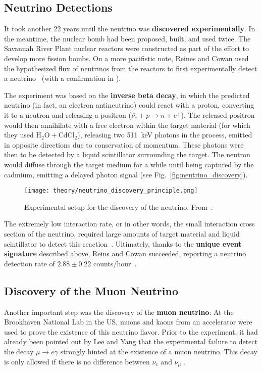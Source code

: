 \subsection{Neutrino Detections}
It took another 22 years until the neutrino was \textbf{discovered experimentally}. In the meantime, the nuclear bomb had been proposed, built, and used twice. The Savannah River Plant nuclear reactors were constructed as part of the effort to develop more fission bombs. On a more pacifistic note, Reines and Cowan used the hypothesized flux of neutrinos from the reactors to first experimentally detect a neutrino~\cite{Reines1956} (with a confirmation in ).

The experiment was based on the \textbf{inverse beta decay}, in which the predicted neutrino (in fact, an electron antineutrino) could react with a proton, converting it to a neutron and releasing a positron ($\bar{\nu_e} + p \rightarrow n + e^+$). The released positron would then annihilate with a free electron within the target material (for which they used $\text{H}_2\text{O} + \text{CdCl}_2$), releasing two \SI{511}{\kilo\eV} photons in the process, emitted in opposite directions due to conservation of momentum. These photons were then to be detected by a liquid scintillator surrounding the target. The neutron would diffuse through the target medium for a while until being captured by the cadmium, emitting a delayed photon signal (see Fig.~\ref{fig:neutrino_discovery}).

\begin{figure}[htb]
    \texttt{[image: theory/neutrino\_discovery\_principle.png]}
    \caption[Neutrino discovery schematic]{Experimental setup for the discovery of the neutrino. From~\cite{Reines1956}.}
\end{figure}

The extremely low interaction rate, or in other words, the small interaction cross section of the neutrino, required large amounts of target material and liquid scintillator to detect this reaction~\cite{Giunti2007}. Ultimately, thanks to the \textbf{unique event signature} described above, Reins and Cowan succeeded, reporting a neutrino detection rate of $2.88 \pm 0.22$ counts/hour~\cite{Reines1956}.

\subsection{Discovery of the Muon Neutrino}
Another important step was the discovery of the \textbf{muon neutrino}: At the Brookhaven National Lab in the US, muons and kaons from an accelerator were used to prove the existence of this neutrino flavor. Prior to the experiment, it had already been pointed out by Lee and Yang that the experimental failure to detect the decay $\mu \rightarrow e \gamma$ strongly hinted at the existence of a muon neutrino. This decay is only allowed if there is no difference between $\nu_e$ and $\nu_\mu$ .

